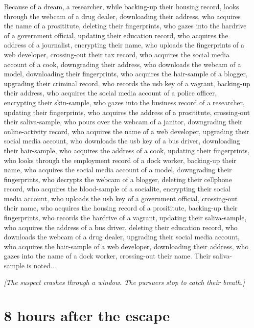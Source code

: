 \documentclass{report}
\begin{document}
Because of a dream, a researcher, while backing-up their housing record, looks through the webcam of a drug dealer, downloading their address, who acquires the name of a prosititute, deleting their fingerprints, who gazes into the hardrive of a government official, updating their education record, who acquires the address of a journalist, encrypting their name, who uploads the fingerprints of a web developer, crossing-out their tax record, who acquires the social media account of a cook, downgrading their address, who downloads the webcam of a model, downloading their fingerprints, who acquires the hair-sample of a blogger, upgrading their criminal record, who records the usb key of a vagrant, backing-up their address, who acquires the social media account of a police officer, encrypting their skin-sample, who gazes into the business record of a researcher, updating their fingerprints, who acquires the address of a prosititute, crossing-out their saliva-sample, who pours over the webcam of a janitor, downgrading their online-activity record, who acquires the name of a web developer, upgrading their social media account, who downloads the usb key of a bus driver, downloading their hair-sample, who acquires the address of a cook, updating their fingerprints, who looks through the employment record of a dock worker, backing-up their name, who acquires the social media account of a model, downgrading their fingerprints, who decrypts the webcam of a blogger, deleting their cellphone record, who acquires the blood-sample of a socialite, encrypting their social media account, who uploads the usb key of a government official, crossing-out their name, who acquires the housing record of a prosititute, backing-up their fingerprints, who records the hardrive of a vagrant, updating their saliva-sample, who acquires the address of a bus driver, deleting their education record, who downloads the webcam of a drug dealer, upgrading their social media account, who acquires the hair-sample of a web developer, downloading their address, who gazes into the name of a dock worker, crossing-out their name. Their saliva-sample is noted...

\textit{[The suspect crashes through a window. The pursuers stop to catch their breath.]}


\section*{8 \small{hours after the escape}}
\end{document}
